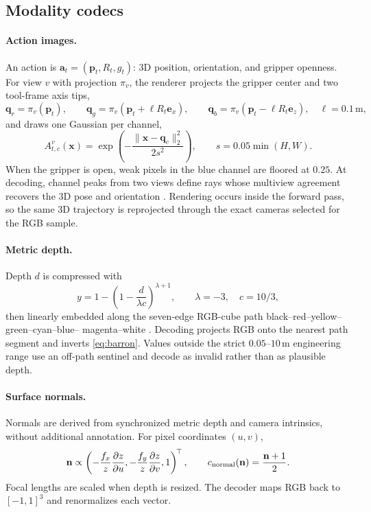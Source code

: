 \documentclass{article}
\begin{document}
\subsection{Modality codecs}
\label{sec:codecs}

\paragraph{Action images.}
An action is $\mathbf{a}_t=(\mathbf{p}_t,R_t,g_t)$: 3D position, orientation, and gripper
openness. For view $v$ with projection $\pi_v$, the renderer projects the gripper center and two
tool-frame axis tips,
\begin{equation}
 \mathbf{q}_{r}=\pi_v(\mathbf{p}_t),\qquad
 \mathbf{q}_{g}=\pi_v(\mathbf{p}_t+\ell R_t\mathbf{e}_x),\qquad
 \mathbf{q}_{b}=\pi_v(\mathbf{p}_t-\ell R_t\mathbf{e}_z),
 \quad \ell=0.1\,\mathrm{m},
\label{eq:actionpoints}
\end{equation}
and draws one Gaussian per channel,
\begin{equation}
 A_{t,c}^{v}(\mathbf{x})=
 \exp\!\left(-\frac{\|\mathbf{x}-\mathbf{q}_c\|_2^2}{2s^2}\right),
 \qquad s=0.05\min(H,W).
\label{eq:actionrender}
\end{equation}
When the gripper is open, weak pixels in the blue channel are floored at $0.25$. At decoding,
channel peaks from two views define rays whose multiview agreement recovers the 3D pose and
orientation \citep{zhen2026action}. Rendering occurs inside the forward pass, so the same 3D
trajectory is reprojected through the exact cameras selected for the RGB sample.

\paragraph{Metric depth.}
Depth $d$ is compressed with
\begin{equation}
 y=1-\left(1-\frac{d}{\lambda c}\right)^{\lambda+1},
 \qquad \lambda=-3,\quad c=10/3,
\label{eq:barron}
\end{equation}
then linearly embedded along the seven-edge RGB-cube path black--red--yellow--green--cyan--blue--
magenta--white \citep{gabeur2026image}. Decoding projects RGB onto the nearest path segment and
inverts \eqref{eq:barron}. Values outside the strict $0.05$--$10$\,m engineering range use an
off-path sentinel and decode as invalid rather than as plausible depth.

\paragraph{Surface normals.}
Normals are derived from synchronized metric depth and camera intrinsics, without additional
annotation. For pixel coordinates $(u,v)$,
\begin{equation}
 \mathbf{n}\propto
 \left(-\frac{f_x}{z}\frac{\partial z}{\partial u},
       -\frac{f_y}{z}\frac{\partial z}{\partial v},1\right)^{\!\top},
 \qquad c_{\rm normal}(\mathbf{n})=\frac{\mathbf{n}+1}{2}.
\label{eq:normal}
\end{equation}
Focal lengths are scaled when depth is resized. The decoder maps RGB back to $[-1,1]^3$ and
renormalizes each vector.
\end{document}
